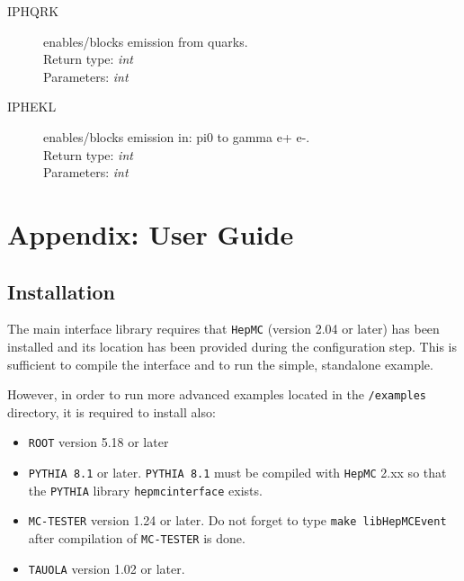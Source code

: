 \documentclass[]{Photos_interface_design}
\begin{document}
\begin{description}
\item[IPHQRK] enables/blocks emission from quarks. \\
  Return type: \textit{int} \\
  Parameters: \textit{int}
\end{description}

\begin{description}
\item[IPHEKL] enables/blocks emission in: pi0 to gamma e+ e-. \\
  Return type: \textit{int} \\
  Parameters: \textit{int}
\end{description}

\section{Appendix: User Guide}
\label{sec:User Guide}

\subsection{Installation}
\label{sec:Installation}
 
The main interface library requires that {\tt HepMC} \cite{Dobbs:2001ck} (version 2.04 or later)  has been installed
and its location has been provided during the configuration step. This is sufficient to compile the interface and to run the simple, standalone example.

However, in order to run more advanced examples located in the {\tt /examples} directory, it is required to install also:

\begin{itemize}
  \item {\tt ROOT} \cite{root-install-www} version 5.18 or later
  \item {\tt PYTHIA 8.1} \cite{Sjostrand:2007gs} or later. {\tt PYTHIA 8.1} must be compiled with {\tt HepMC} 2.xx
        so that the {\tt PYTHIA} library {\tt hepmcinterface} exists.
  \item {\tt MC-TESTER} \cite{Golonka:2002rz,Davidson:2008ma} version 1.24 or later.
        Do not forget to type {\tt make libHepMCEvent} after compilation of {\tt MC-TESTER} is done.
  \item {\tt TAUOLA} \cite{Davidson:2010rw} version 1.02 or later.
\end{itemize}
\end{document}
